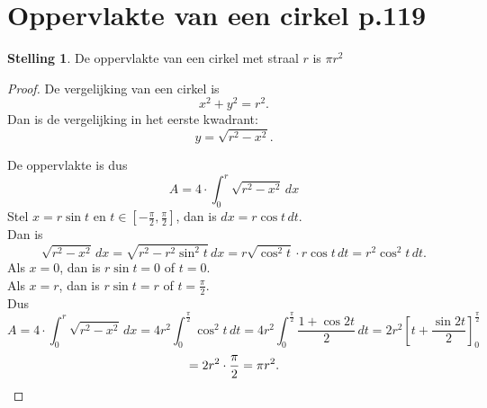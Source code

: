 \documentclass{article}
\theoremstyle{definition}
\newtheorem*{Stelling}{Stelling}
\begin{document}
\section{Oppervlakte van een cirkel p.119}
\begin{Stelling}
    De oppervlakte van een cirkel met straal $r$ is $\pi r^2$
\end{Stelling}

\begin{proof}
De vergelijking van een cirkel is $$x^2+y^2=r^2.$$
Dan is de vergelijking in het eerste kwadrant:
$$y=\sqrt{r^2-x^2}.$$
De oppervlakte is dus
$$A=4\cdot \int_0^r\sqrt{r^2-x^2}\, dx$$
Stel $x=r\sin t$ en $t\in\left[-\frac{\pi}{2},\frac{\pi}{2}\right]$, dan is $dx =r\cos t\, dt$. 
\\ Dan is $$\sqrt{r^2-x^2}\,dx = \sqrt{r^2-r^2\sin^2t}\, dx=r\sqrt{\cos^2t}\cdot r\cos t\,dt = r^2\cos^2t\,dt.$$
Als $x=0$, dan is $r\sin t = 0$ of $t=0$.\\
Als $x=r$, dan is $r\sin t = r$ of $t=\frac{\pi}{2}$.\\
Dus $$A = 4\cdot\int_0^r \sqrt{r^2-x^2}\, dx =4r^2\int_0^\frac{\pi}{2}\cos^2t\,dt = 4r^2\int_0^\frac{\pi}{2} \frac{1+\cos2t}{2}\,dt = 2r^2\left[t + \frac{\sin2t}{2}\right]_0^\frac{\pi}{2}$$ $$=\\ 2r^2\cdot\frac{\pi}{2} = \pi r^2.$$


\end{proof}
\end{document}

